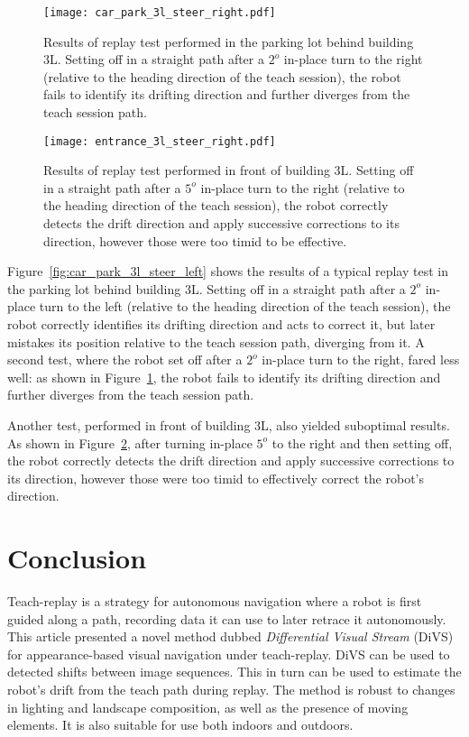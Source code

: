 \documentclass[twocolumn, 9pt,fleqn]{jsproceedings}
\begin{document}
\begin{figure}[h!]
\centering
\texttt{[image: car\_park\_3l\_steer\_right.pdf]}
\caption{Results of replay test performed in the parking lot behind building 3L. Setting off in a straight path after a $2^o$ in-place turn to the right (relative to the heading direction of the teach session), the robot fails to identify its drifting direction and further diverges from the teach session path.}
\label{fig:car_park_3l_steer_right}
\end{figure}

\begin{figure}[h!]
\centering
\texttt{[image: entrance\_3l\_steer\_right.pdf]}
\caption{Results of replay test performed in front of building 3L. Setting off in a straight path after a $5^o$ in-place turn to the right (relative to the heading direction of the teach session), the robot correctly detects the drift direction and apply successive corrections to its direction, however those were too timid to be effective.}
\label{fig:entrance_3l_steer_right}
\end{figure}

Figure~\ref{fig:car_park_3l_steer_left} shows the results of a typical replay test in the parking lot behind building 3L. Setting off in a straight path after a $2^o$ in-place turn to the left (relative to the heading direction of the teach session), the robot correctly identifies its drifting direction and acts to correct it, but later mistakes its position relative to the teach session path, diverging from it. A second test, where the robot set off after a $2^o$ in-place turn to the right, fared less well: as shown in Figure~\ref{fig:car_park_3l_steer_right}, the robot fails to identify its drifting direction and further diverges from the teach session path.

Another test, performed in front of building 3L, also yielded suboptimal results. As shown in Figure~\ref{fig:entrance_3l_steer_right}, after turning in-place $5^o$ to the right and then setting off, the robot correctly detects the drift direction and apply successive corrections to its direction, however those were too timid to effectively correct the robot's direction.

\section{Conclusion}

Teach-replay is a strategy for autonomous navigation where a robot is first guided along a path, recording data it can use to later retrace it autonomously. This article presented a novel method dubbed \textit{Differential Visual Stream} (DiVS) for appearance-based visual navigation under teach-replay. DiVS can be used to detected shifts between image sequences. This in turn can be used to estimate the robot's drift from the teach path during replay. The method is robust to changes in lighting and landscape composition, as well as the presence of moving elements. It is also suitable for use both indoors and outdoors.
\end{document}
